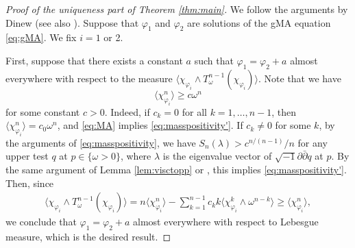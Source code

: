 \documentclass{amsart}
\numberwithin{equation}{section}
\theoremstyle{plain}
\theoremstyle{definition}
\theoremstyle{remark}
\newcommand{\delb}{\sqrt{-1}\partial\bar{\partial}}
\begin{document}
\begin{proof}[Proof of the uniqueness part of Theorem \ref{thm:main}]
    We follow the arguments by Dinew \cite{Dinew} (see also \cite[Section 3.3]{BEGZ}). Suppose that $\varphi_1$ and $\varphi_2$ are solutions of the gMA equation \eqref{eq:gMA}. We fix $i=1$ or 2.
    
    First, suppose that there exists a constant $a$ such that $\varphi_1=\varphi_2+a$ almost everywhere with respect to the measure $\langle\chi_{\varphi_i}\wedge T^{n-1}_\omega(\chi_{\varphi_i})\rangle$. Note that we have 
    \begin{equation}\label{eq:masspositivity'}
        \langle\chi_{\varphi_i}^n\rangle\ge c\omega^n
    \end{equation}
    for some constant $c>0$. Indeed, if $c_k=0$ for all $k=1,\dots,n-1$, then $\langle\chi_{\varphi_i}^n\rangle=c_0\omega^n$, and \eqref{eq:MA} implies \eqref{eq:masspositivity'}. If $c_k\neq0$ for some $k$, by the arguments of \eqref{eq:masspositivity}, we have $S_n(\lambda)>c^{n/(n-1)}/n$
    for any upper test $q$ at $p\in\{\omega>0\}$, where $\lambda$ is the eigenvalue vector of $\delb q$ at $p$. 
    By the same argument of Lemma \ref{lem:visctopp} or \cite[Corollary 2.6]{EGZ}, this implies \eqref{eq:masspositivity'}.
    Then, since
    \begin{equation*}
        \begin{aligned}
            \langle\chi_{\varphi_i}\wedge T^{n-1}_\omega(\chi_{\varphi_i})\rangle
            =n\langle\chi_{\varphi_i}^n\rangle-\sum_{k=1}^{n-1}c_k k\langle\chi_{\varphi_i}^k\wedge\omega^{n-k}\rangle\ge\langle\chi_{\varphi_i}^n\rangle,
        \end{aligned}
    \end{equation*}
    we conclude that $\varphi_1=\varphi_2+a$ almost everywhere with respect to Lebesgue measure, which is the desired result.
    

\end{proof}
\end{document}

